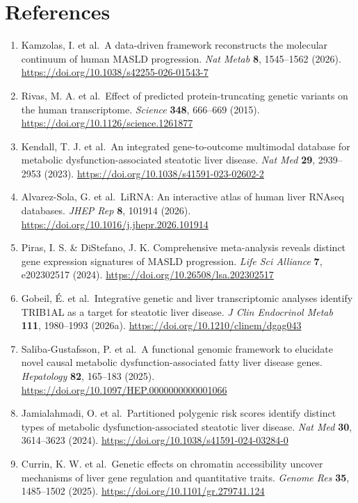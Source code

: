 \section*{References}\label{references}

\begin{enumerate}
\def\labelenumi{\arabic{enumi}.}
\item
  Kamzolas, I. et al.~A data-driven framework reconstructs the molecular continuum of human MASLD progression. \emph{Nat Metab} \textbf{8}, 1545--1562 (2026). \url{https://doi.org/10.1038/s42255-026-01543-7}
\item
  Rivas, M. A. et al.~Effect of predicted protein-truncating genetic variants on the human transcriptome. \emph{Science} \textbf{348}, 666--669 (2015). \url{https://doi.org/10.1126/science.1261877}
\item
  Kendall, T. J. et al.~An integrated gene-to-outcome multimodal database for metabolic dysfunction-associated steatotic liver disease. \emph{Nat Med} \textbf{29}, 2939--2953 (2023). \url{https://doi.org/10.1038/s41591-023-02602-2}
\item
  Alvarez-Sola, G. et al.~LiRNA: An interactive atlas of human liver RNAseq databases. \emph{JHEP Rep} \textbf{8}, 101914 (2026). \url{https://doi.org/10.1016/j.jhepr.2026.101914}
\item
  Piras, I. S. \& DiStefano, J. K. Comprehensive meta-analysis reveals distinct gene expression signatures of MASLD progression. \emph{Life Sci Alliance} \textbf{7}, e202302517 (2024). \url{https://doi.org/10.26508/lsa.202302517}
\item
  Gobeil, É. et al.~Integrative genetic and liver transcriptomic analyses identify TRIB1AL as a target for steatotic liver disease. \emph{J Clin Endocrinol Metab} \textbf{111}, 1980--1993 (2026a). \url{https://doi.org/10.1210/clinem/dgag043}
\item
  Saliba-Gustafsson, P. et al.~A functional genomic framework to elucidate novel causal metabolic dysfunction-associated fatty liver disease genes. \emph{Hepatology} \textbf{82}, 165--183 (2025). \url{https://doi.org/10.1097/HEP.0000000000001066}
\item
  Jamialahmadi, O. et al.~Partitioned polygenic risk scores identify distinct types of metabolic dysfunction-associated steatotic liver disease. \emph{Nat Med} \textbf{30}, 3614--3623 (2024). \url{https://doi.org/10.1038/s41591-024-03284-0}
\item
  Currin, K. W. et al.~Genetic effects on chromatin accessibility uncover mechanisms of liver gene regulation and quantitative traits. \emph{Genome Res} \textbf{35}, 1485--1502 (2025). \url{https://doi.org/10.1101/gr.279741.124}

\end{enumerate}
